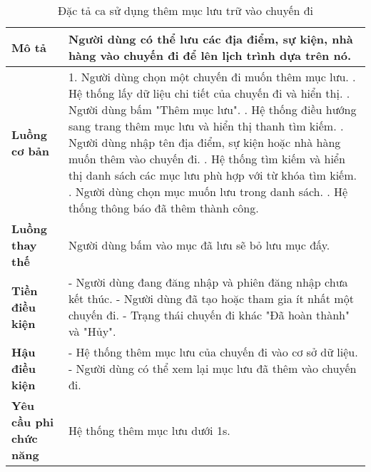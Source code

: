 \begin{longtable}{| p{4cm} | p{\dimexpr\linewidth-4cm-4\tabcolsep} |} %
    \caption{Đặc tả ca sử dụng thêm mục lưu trữ vào chuyến đi} %
    \label{tab:uc_add_saved_item_spec} \\ %

    \hline
    \textbf{Mô tả} & Người dùng có thể lưu các địa điểm, sự kiện, nhà hàng vào chuyến đi để lên lịch trình dựa trên nó. \\
    \hline
    \endfirsthead %



    \hline %
    \endlastfoot

    \textbf{Luồng cơ bản} & 1. Người dùng chọn một chuyến đi muốn thêm mục lưu. \newline
                           2. Hệ thống lấy dữ liệu chi tiết của chuyến đi và hiển thị. \newline
                           3. Người dùng bấm "Thêm mục lưu". \newline
                           4. Hệ thống điều hướng sang trang thêm mục lưu và hiển thị thanh tìm kiếm. \newline
                           5. Người dùng nhập tên địa điểm, sự kiện hoặc nhà hàng muốn thêm vào chuyến đi. \newline
                           6. Hệ thống tìm kiếm và hiển thị danh sách các mục lưu phù hợp với từ khóa tìm kiếm. \newline
                           7. Người dùng chọn mục muốn lưu trong danh sách. \newline
                           8. Hệ thống thông báo đã thêm thành công. \\
    \hline
    \textbf{Luồng thay thế} & Người dùng bấm vào mục đã lưu sẽ bỏ lưu mục đấy. \\
    \hline
    \textbf{Tiền điều kiện} & - Người dùng đang đăng nhập và phiên đăng nhập chưa kết thúc.\newline
                           - Người dùng đã tạo hoặc tham gia ít nhất một chuyến đi. \newline
                           - Trạng thái chuyến đi khác "Đã hoàn thành" và "Hủy". \\
    \hline
    \textbf{Hậu điều kiện} & - Hệ thống thêm mục lưu của chuyến đi vào cơ sở dữ liệu.\newline
                           - Người dùng có thể xem lại mục lưu đã thêm vào chuyến đi. \\
    \hline
    \textbf{Yêu cầu phi chức năng} & Hệ thống thêm mục lưu dưới 1s. \\

\end{longtable}


